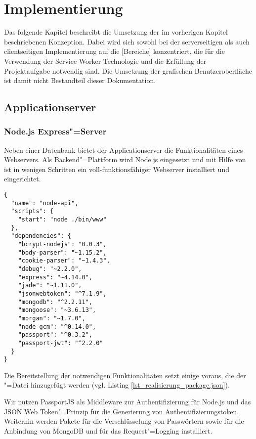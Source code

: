\chapter{Implementierung}

Das folgende Kapitel beschreibt die Umsetzung der im vorherigen Kapitel beschriebenen Konzeption. Dabei wird sich sowohl bei der serverseitigen als auch clientseitigen Implementierung auf die [Bereiche] konzentriert, die für die Verwendung der Service Worker Technologie und die Erfüllung der Projektaufgabe notwendig sind. Die Umsetzung der grafischen Benutzeroberfläche ist damit nicht Bestandteil dieser Dokumentation.

\section{Applicationserver}

\subsection{Node.js Express"=Server}
\label{subsec_implementierung_applicationserver}

Neben einer Datenbank bietet der Applicationserver die Funktionalitäten eines Webservers. Als Backend"=Plattform wird Node.js eingesetzt und mit Hilfe von  ist in wenigen Schritten ein voll-funktionsfähiger Webserver installiert und eingerichtet. \\

\begin{lstlisting}[caption={package.json - notwendige Node.js Pakete},label={lst_realisierung_package.json}, frame=single]
{
  "name": "node-api",
  "scripts": {
    "start": "node ./bin/www"
  },
  "dependencies": {
    "bcrypt-nodejs": "0.0.3",
    "body-parser": "~1.15.2",
    "cookie-parser": "~1.4.3",
    "debug": "~2.2.0",
    "express": "~4.14.0",
    "jade": "~1.11.0",
    "jsonwebtoken": "^7.1.9",
    "mongodb": "^2.2.11",
    "mongoose": "~3.6.13",
    "morgan": "~1.7.0",
    "node-gcm": "^0.14.0",
    "passport": "^0.3.2",
    "passport-jwt": "^2.2.0"
  }
}
\end{lstlisting}


Die Bereitstellung der notwendigen Funktionalitäten setzt einige  voraus, die der "=Datei hinzugefügt werden (vgl. Listing \ref{lst_realisierung_package.json}). 

Wir nutzen \glqq PassportJS\grqq{} als Middleware zur Authentifizierung für Node.js und das \glqq JSON Web Token\grqq "=Prinzip für die Generierung von Authentifizierungstoken. Weiterhin werden Pakete für die Verschlüsselung von Passwörtern sowie für die Anbindung von MongoDB und  für das Request"=Logging installiert.

